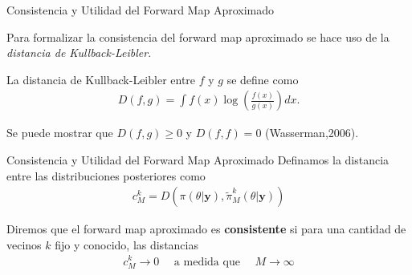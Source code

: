 \documentclass[10pt,aspectratio=169]{beamer}
\begin{document}
\begin{frame}{Consistencia y Utilidad del Forward Map Aproximado}

  Para formalizar la consistencia del forward map  aproximado se hace uso de la \textit{distancia de Kullback-Leibler}.

  La distancia de Kullback-Leibler entre $f$ y $g$ se define como
  \begin{align*}
      D(f,g) = \int f(x)\log \left(\frac{f(x)}{g(x)}\right) dx.
  \end{align*}

  Se puede mostrar que $D(f,g) \geq 0$ y $D(f,f) = 0$ (Wasserman,2006).

\end{frame}

\begin{frame}{Consistencia y Utilidad del Forward Map Aproximado}
  Definamos la distancia entre las distribuciones posteriores como
  \begin{align*}
      c^k_M = D \left( \pi(\theta|\mathbf{y}),\tilde{\pi}^{k}_M(\theta|\mathbf{y})\right)
  \end{align*}

  Diremos que el forward map aproximado es \textbf{consistente} si para una cantidad de vecinos $k$ fijo y conocido, las distancias 
  \begin{align*}
      c^k_M \rightarrow 0 \:\:\:\:\:\: \text{a medida que}\:\:\:\:\:\: M \rightarrow \infty
  \end{align*}
\end{frame}



















\begin{frame}
  
\end{frame}

\begin{frame}
  
\end{frame}

\begin{frame}
  
\end{frame}

\begin{frame}
  
\end{frame}
\end{document}
